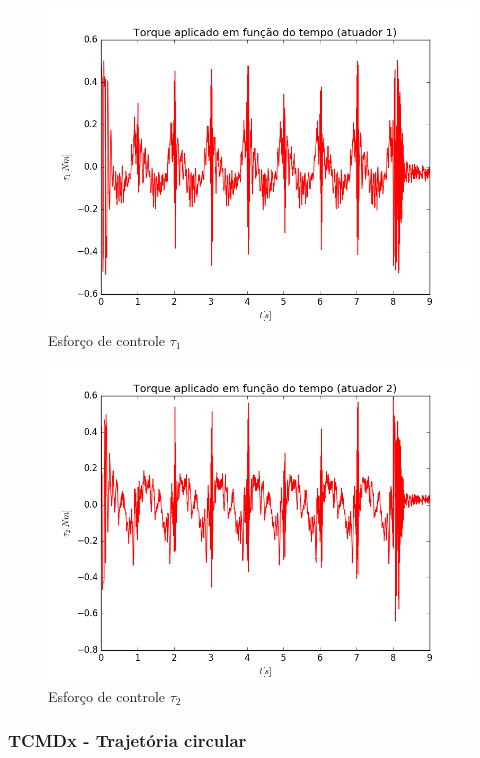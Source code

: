 \documentclass[]{politex}
\begin{document}
\begin{multicols}{2}
\begin{figure}[H]
	\centering
	\includegraphics[scale=0.39]{../../../Experimental/Aquisicoes/CTCx_circulo/tau1.png}  
	\caption{Esforço de controle $\tau_1$}
	\label{fig:CTCx_circulo_tau1}
\end{figure}
\begin{figure}[H]
	\centering
	\includegraphics[scale=0.39]{../../../Experimental/Aquisicoes/CTCx_circulo/tau2.png}  
	\caption{Esforço de controle $\tau_2$}
	\label{fig:CTCx_circulo_tau2}
\end{figure}
\end{multicols}

\subsubsection{TCMDx - Trajetória circular}
\end{document}
